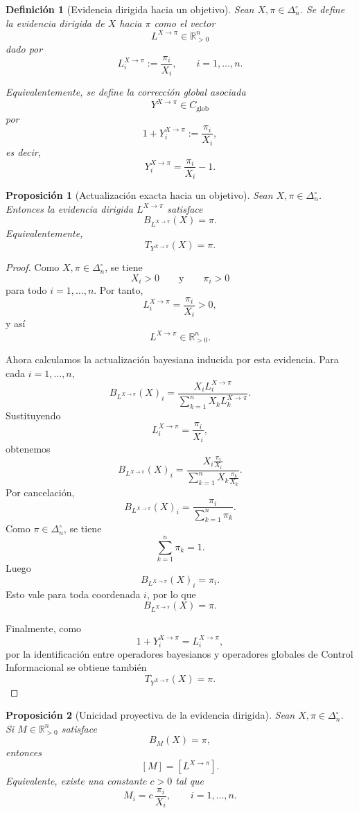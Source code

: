 \documentclass[12pt]{article}
\newtheorem{definicion}{Definición}[section]
\newtheorem{proposicion}{Proposición}[section]
\begin{document}
\begin{definicion}[Evidencia dirigida hacia un objetivo]
Sean \(X,\pi\in\Delta_n^\circ\). Se define la \emph{evidencia dirigida de
\(X\) hacia \(\pi\)} como el vector
\[
L^{X\to \pi}
\in \mathbb{R}_{>0}^{n}
\]
dado por
\[
L_i^{X\to \pi}
:=
\frac{\pi_i}{X_i},
\qquad
i=1,\dots,n.
\]

Equivalentemente, se define la corrección global asociada
\[
Y^{X\to \pi}\in C_{\mathrm{glob}}
\]
por
\[
1+Y_i^{X\to \pi}
:=
\frac{\pi_i}{X_i},
\]
es decir,
\[
Y_i^{X\to \pi}
=
\frac{\pi_i}{X_i}-1.
\]
\end{definicion}

\begin{proposicion}[Actualización exacta hacia un objetivo]
Sean \(X,\pi\in\Delta_n^\circ\). Entonces la evidencia dirigida
\(L^{X\to \pi}\) satisface
\[
B_{L^{X\to \pi}}(X)=\pi.
\]
Equivalentemente,
\[
T_{Y^{X\to \pi}}(X)=\pi.
\]
\end{proposicion}

\begin{proof}
Como \(X,\pi\in\Delta_n^\circ\), se tiene
\[
X_i>0
\qquad\text{y}\qquad
\pi_i>0
\]
para todo \(i=1,\dots,n\). Por tanto,
\[
L_i^{X\to \pi}
=
\frac{\pi_i}{X_i}
>
0,
\]
y así
\[
L^{X\to \pi}\in\mathbb{R}_{>0}^{n}.
\]

Ahora calculamos la actualización bayesiana inducida por esta evidencia. Para cada
\(i=1,\dots,n\),
\[
B_{L^{X\to \pi}}(X)_i
=
\frac{
X_iL_i^{X\to \pi}
}{
\sum_{k=1}^{n}X_kL_k^{X\to \pi}
}.
\]
Sustituyendo
\[
L_i^{X\to \pi}
=
\frac{\pi_i}{X_i},
\]
obtenemos
\[
B_{L^{X\to \pi}}(X)_i
=
\frac{
X_i\frac{\pi_i}{X_i}
}{
\sum_{k=1}^{n}
X_k\frac{\pi_k}{X_k}
}.
\]
Por cancelación,
\[
B_{L^{X\to \pi}}(X)_i
=
\frac{
\pi_i
}{
\sum_{k=1}^{n}\pi_k
}.
\]
Como \(\pi\in\Delta_n^\circ\), se tiene
\[
\sum_{k=1}^{n}\pi_k=1.
\]
Luego
\[
B_{L^{X\to \pi}}(X)_i=\pi_i.
\]
Esto vale para toda coordenada \(i\), por lo que
\[
B_{L^{X\to \pi}}(X)=\pi.
\]

Finalmente, como
\[
1+Y_i^{X\to \pi}=L_i^{X\to \pi},
\]
por la identificación entre operadores bayesianos y operadores globales de Control
Informacional se obtiene también
\[
T_{Y^{X\to \pi}}(X)=\pi.
\]
\end{proof}

\begin{proposicion}[Unicidad proyectiva de la evidencia dirigida]
Sean \(X,\pi\in\Delta_n^\circ\). Si \(M\in\mathbb{R}_{>0}^{n}\) satisface
\[
B_M(X)=\pi,
\]
entonces
\[
[M]=[L^{X\to \pi}].
\]
Equivalente, existe una constante \(c>0\) tal que
\[
M_i
=
c\,\frac{\pi_i}{X_i},
\qquad
i=1,\dots,n.
\]
\end{proposicion}
\end{document}
